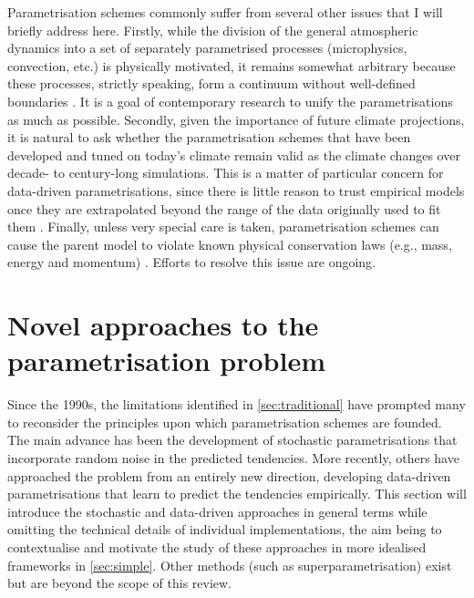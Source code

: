 \documentclass[titlepage,twoside]{article}
\numberwithin{equation}{section}
\begin{document}
Parametrisation schemes commonly suffer from several other issues that I will
briefly address here.
Firstly, while the division of the general atmospheric dynamics into a set of
separately parametrised processes (microphysics, convection, etc.) is
physically motivated, it remains somewhat arbitrary because these processes,
strictly speaking, form a continuum without well-defined boundaries
\parencite{christensen2022,mcfarlane2011}. It is a goal of contemporary
research to unify the parametrisations as much as possible.
Secondly, given the importance of future climate projections, it is natural to
ask whether the parametrisation schemes that have been developed and tuned on
today's climate remain valid as the climate changes over decade- to
century-long simulations. This is a matter of particular concern for
data-driven parametrisations, since there is little reason to trust empirical
models once they are extrapolated beyond the range of the data originally used
to fit them \parencite{christensen2022}.
Finally, unless very special care is taken, parametrisation schemes can cause
the parent model to violate known physical conservation laws (e.g., mass,
energy and momentum) \parencite{christensen2022}. Efforts to resolve this issue
are ongoing.


\clearpage
\section{Novel approaches to the parametrisation problem}%
\label{sec:novel}
Since the 1990s, the limitations identified in \cref{sec:traditional} have
prompted many to reconsider the principles upon which parametrisation schemes
are founded. The main advance has been the development of stochastic
parametrisations that incorporate random noise in the predicted tendencies.
More recently, others have approached the problem from an entirely new
direction, developing data-driven parametrisations that learn to predict the
tendencies empirically. This section will introduce the stochastic and
data-driven approaches in general terms while omitting the technical details of
individual implementations, the aim being to contextualise and motivate the
study of these approaches in more idealised frameworks in \cref{sec:simple}.
Other methods (such as superparametrisation) exist but are beyond the scope of
this review.
\end{document}
